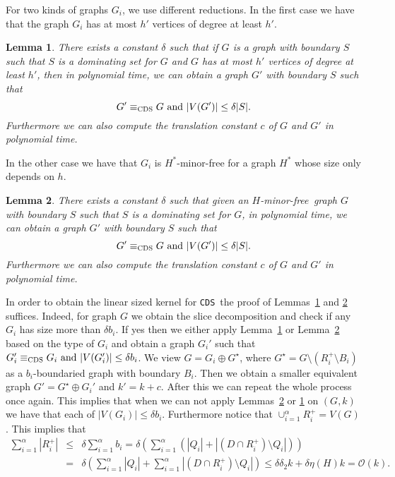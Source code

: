 \documentclass[11pt]{article}
\newtheorem{lemma}{Lemma}
\newcommand{\Hmf}{$H$-minor-free}
\newcommand{\tCDS}{{\texttt{\sc CDS}}}
\newcommand{\cO}{\mathcal{O}}
\begin{document}
For  two kinds of graphs $G_i$, we use different reductions. 
 In the first case we have that the graph $G_i$ has at most $h'$ vertices of degree at least $h'$.
\begin{lemma}
\label{lem:newperspectivequasicds}
There exists a constant $\delta$ such that if  $G$  is a graph with boundary $S$  such that $S$ is a dominating set for $G$ and $G$ has at most $h'$ vertices of degree at least $h'$, then in polynomial time, we can obtain a graph $G'$ with boundary $S$ 
such that \[G' \equiv_{\tCDS} G \mbox{ and }  |V(G')| \leq \delta |S| .\] 
Furthermore we can also compute the translation constant $c$ of $G$ and $G'$ in polynomial time. 
\end{lemma}
  In the other  case we have that $G_i$ is $H^*$-minor-free for a graph $H^*$ whose size only depends on $h$.  \begin{lemma}
\label{lem:newperspectiveHminorcds}
There exists a constant $\delta$ such that  given an \Hmf \, graph $G$  with boundary $S$ 
such that $S$ is a dominating set for $G$, in polynomial time, we can obtain a graph $G'$ with boundary $S$ such that 
\[G' \equiv_{\tCDS} G \mbox{ and }  |V(G')| \leq \delta |S| .\] 
Furthermore we can also compute the translation constant $c$ of $G$ and $G'$ in polynomial time. 
\end{lemma}


In order to obtain the linear sized kernel for \tCDS \, the proof of  
 Lemmas~\ref{lem:newperspectivequasicds} and \ref{lem:newperspectiveHminorcds} suffices. 
 Indeed, for  graph $G$ we 
obtain the slice decomposition and check if any  $G_i$ has size more than $\delta b_i$. If yes then we either apply  
Lemma~\ref{lem:newperspectivequasicds} or Lemma~\ref{lem:newperspectiveHminorcds} based on the type of $G_i$ 
and obtain a graph $G_i'$ such that  $G_i' \equiv_{\tCDS} G_i \mbox{ and }  |V(G_i')| \leq \delta b_i$. We view 
$G=G_i\oplus G^{\star}$, where $G^{\star}=G\setminus (R_i^{+} \setminus B_i)$ as a $b_i$-boundaried graph with 
boundary $B_i$. Then we obtain  a smaller equivalent graph $G'=G^{\star}\oplus G_i' $ and $k'=k+c$.  After this we can 
repeat the whole process once again. This implies that when we can not apply Lemmas~\ref{lem:newperspectiveHminorcds} or  
\ref{lem:newperspectivequasicds}  on $(G,k)$ we have that each of 
$|V(G_i)|\leq \delta b_i$.  Furthermore notice that $\cup_{i=1}^{\alpha} R_i^{+}=V(G)$. This implies that  \begin{eqnarray*}
\sum_{i=1}^{\alpha} |R_{i}^+| & \leq & \delta \sum_{i=1}^{\alpha} b_i =  \delta (\sum_{i=1}^{\alpha} (|Q_i|+|(D \cap R_i^+)\setminus Q_i|)) \\
& = &
\delta (\sum_{i=1}^{\alpha} |Q_i| +  \sum_{i=1}^{\alpha} |(D \cap R_i^+)\setminus Q_i|) 
\leq \delta \delta_2 k + \delta \eta(H)k = \cO(k). 
\end{eqnarray*}
\end{document}

